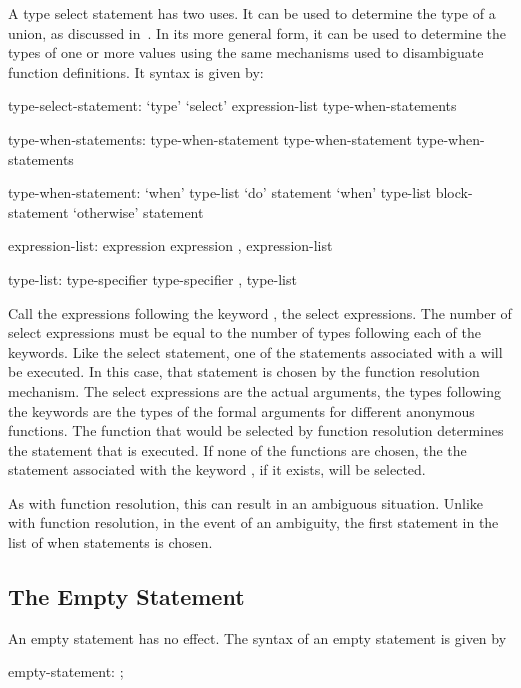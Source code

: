 
A type select statement has two uses.  It can be used to determine the
type of a union, as discussed
in~.  In its more general
form, it can be used to determine the types of one or more values
using the same mechanisms used to disambiguate function definitions.
It syntax is given by:
\begin{syntax}
type-select-statement:
  `type' `select' expression-list { type-when-statements }

type-when-statements:
  type-when-statement
  type-when-statement type-when-statements

type-when-statement:
  `when' type-list `do' statement
  `when' type-list block-statement
  `otherwise' statement

expression-list:
  expression
  expression , expression-list

type-list:
  type-specifier
  type-specifier , type-list
\end{syntax}

Call the expressions following the keyword , the select
expressions.  The number of select expressions must be equal to the
number of types following each of the  keywords.  Like the
select statement, one of the statements associated with a 
will be executed.  In this case, that statement is chosen by the
function resolution mechanism.  The select expressions are the actual
arguments, the types following the  keywords are the types
of the formal arguments for different anonymous functions.  The
function that would be selected by function resolution determines the
statement that is executed.  If none of the functions are chosen, the
the statement associated with the keyword , if it
exists, will be selected.

As with function resolution, this can result in an ambiguous
situation.  Unlike with function resolution, in the event of an
ambiguity, the first statement in the list of when statements is
chosen.

\subsection{The Empty Statement}
\label{The_Empty_Statement}

An empty statement has no effect.  The syntax of an empty statement is
given by
\begin{syntax}
empty-statement:
  ;
\end{syntax}
